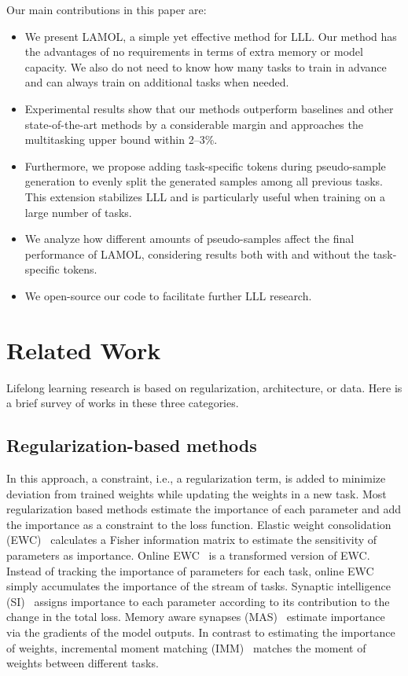 \documentclass{article} \usepackage{iclr2020_conference,times}
\begin{document}
Our main contributions in this paper are:
\begin{itemize}[leftmargin=*]
    \item We present LAMOL, a simple yet effective method for LLL. Our method has the advantages of no requirements in terms of extra memory or model capacity. We also do not need to know how many tasks to train in advance and can always train on additional tasks when needed.
    \item Experimental results show that our methods outperform baselines and other state-of-the-art methods by a considerable margin and approaches the multitasking upper bound within 2--3\%.
    \item Furthermore, we propose adding task-specific tokens during pseudo-sample generation to evenly split the generated samples among all previous tasks. This extension stabilizes LLL and is particularly useful when training on a large number of tasks.
    \item We analyze how different amounts of pseudo-samples affect the final performance of LAMOL, considering results both with and without the task-specific tokens.
    \item We open-source our code to facilitate further LLL research.
\end{itemize}




\section{Related Work}
Lifelong learning research is based on regularization, architecture, or data.
Here is a brief survey of works in these three categories.

\subsection{Regularization-based methods}

In this approach, a constraint, i.e., a regularization term, is added to minimize deviation from trained weights while updating the weights in a new task.
Most regularization based methods estimate the importance of each parameter and add the importance as a constraint to the loss function.
Elastic weight consolidation (EWC)~\citep{kirkpatrick2017overcoming} calculates a Fisher information matrix to estimate the sensitivity of parameters as importance.
Online EWC~\citep{schwarz2018progress} is a transformed version of EWC.
Instead of tracking the importance of parameters for each task, online EWC simply accumulates the importance of the stream of tasks.
Synaptic intelligence (SI)~\citep{zenke2017continual} assigns importance to each parameter according to its contribution to the change in the total loss.
Memory aware synapses (MAS)~\citep{aljundi2018memory} estimate importance via the gradients of the model outputs. 
In contrast to estimating the importance of weights, incremental moment matching (IMM)~\citep{lee2017overcoming} matches the moment of weights between different tasks.
\end{document}
